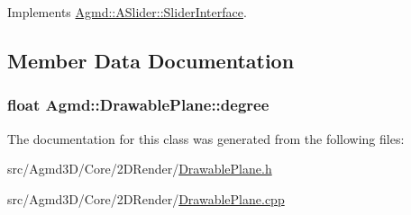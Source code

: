 Implements \hyperlink{class_agmd_1_1_a_slider_1_1_slider_interface_ae6c98844c5f0ee73ff5eac7da47fa2c1}{Agmd\+::\+A\+Slider\+::\+Slider\+Interface}.



\subsection{Member Data Documentation}
\hypertarget{class_agmd_1_1_drawable_plane_a4f7de675a60284b412215de75b14800d}{
\subsubsection[{degree}]{\setlength{\rightskip}{0pt plus 5cm}float Agmd\+::\+Drawable\+Plane\+::degree}}\label{class_agmd_1_1_drawable_plane_a4f7de675a60284b412215de75b14800d}


The documentation for this class was generated from the following files\+:\begin{DoxyCompactItemize}
\item 
src/\+Agmd3\+D/\+Core/2\+D\+Render/\hyperlink{_drawable_plane_8h}{Drawable\+Plane.\+h}\item 
src/\+Agmd3\+D/\+Core/2\+D\+Render/\hyperlink{_drawable_plane_8cpp}{Drawable\+Plane.\+cpp}\end{DoxyCompactItemize}
